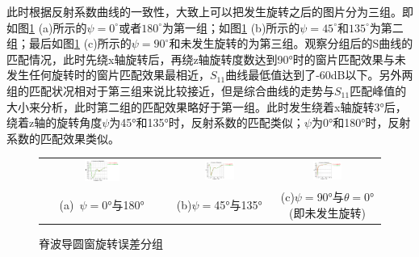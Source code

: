\documentclass[master]{thesis-uestc}
\begin{document}
此时根据反射系数曲线的一致性，大致上可以把发生旋转之后的图片分为三组。即如图\ref{fig:脊波导圆窗旋转分组} (a)所示的$\psi = 0 ^\circ$或者$180 ^\circ$为第一组；如图\ref{fig:脊波导圆窗旋转分组} (b)所示的$\psi = 45 ^\circ$和$135 ^\circ$为第二组；最后如图\ref{fig:脊波导圆窗旋转分组} (c)所示的$\psi = 90 ^\circ$和未发生旋转的为第三组。观察分组后的S曲线的匹配情况，此时先绕x轴旋转后，再绕z轴旋转度数达到90°时的窗片匹配效果与未发生任何旋转时的窗片匹配效果最相近，\(S_{11}\)曲线最低值达到了-60dB以下。另外两组的匹配状况相对于第三组来说比较接近，但是综合曲线的走势与\(S_{11}\)匹配峰值的大小来分析，此时第二组的匹配效果略好于第一组。此时发生绕着x轴旋转3°后，绕着z轴的旋转角度\(\psi\)为45°和135°时，反射系数的匹配类似；\(\psi\)为0°和180°时，反射系数的匹配效果类似。
\begin{figure}[!htb]
    \small
    \centering
    \begin{tabular}{@{\ }c@{\ }c@{\ }c}
        \includegraphics[width=0.3\textwidth]{pic/chapter5/分组-0-180.png} & 
        \hspace{5pt}
        \includegraphics[width=0.3\textwidth]{pic/chapter5/分组-45-135.png}&
        \hspace{5pt}
        \includegraphics[width=0.3\textwidth]{pic/chapter5/分组-90.png}      \\
        \mbox{\small (a) \(\psi=\)0°与180°}                                                                               & 
        \mbox{\small (b)\(\psi=\)45°与135°} & 
        \mbox{\small (c)\(\psi=\)90°与\(\theta=\)0°(即未发生旋转)}                                                                                  \\
    \end{tabular}
    \caption{脊波导圆窗旋转误差分组}
    \label{fig:脊波导圆窗旋转分组}
\end{figure}
\end{document}
